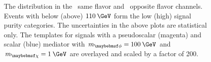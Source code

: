 \begin{figure}
  \caption{The \mttll distribution in the~\protect{} same flavor and~\protect{} opposite flavor channels. Events with \mttll below (above) $110\:\GeV$ form the low (high) signal purity categories. The uncertainties in the above plots are statistical only. The \mttll templates for signals with a pseudoscalar (magenta) and scalar (blue) mediator with $\mMed=100\:\GeV$ and $\mDM=1\:\GeV$ are overlayed and scaled by a factor of 200.}
  \label{fig:mt2_sr}
\end{figure}

